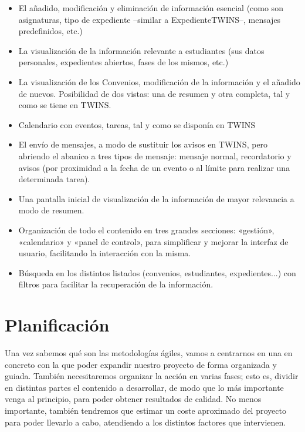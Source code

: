 \begin{itemize}
	\item El añadido, modificación y eliminación de información esencial (como son asignaturas, tipo de expediente --similar a \gls{ExpedienteTWINS}--, mensajes predefinidos, etc.)
	\item La visualización de la información relevante a estudiantes (sus datos personales, expedientes abiertos, fases de los mismos, etc.)
	\item La visualización de los \glspl{Convenio}, modificación de la información y el añadido de nuevos. Posibilidad de dos vistas: una de resumen y otra completa, tal y como se tiene en TWINS.
	\item Calendario con eventos, tareas, tal y como se disponía en TWINS
	\item El envío de mensajes, a modo de sustituir los avisos en TWINS, pero abriendo el abanico a tres tipos de mensaje: mensaje normal, recordatorio y avisos (por proximidad a la fecha de un evento o al límite para realizar una determinada tarea).
	\item Una pantalla inicial de visualización de la información de mayor relevancia a modo de resumen. 
	\item Organización de todo el contenido en tres grandes secciones: «gestión», «calendario» y «panel de control», para simplificar y mejorar la interfaz de usuario, facilitando la interacción con la misma.
	\item Búsqueda en los distintos listados (convenios, estudiantes, expedientes...) con filtros para facilitar la recuperación de la información.
\end{itemize}



\section{Planificación}
\label{sec:planificacion}

Una vez sabemos qué son las metodologías ágiles, vamos a centrarnos en una en concreto con la que poder expandir nuestro proyecto de forma organizada y guiada. También necesitaremos organizar la acción en varias fases; esto es, dividir en distintas partes el contenido a desarrollar, de modo que lo más importante venga al principio, para poder obtener resultados de calidad. No menos importante, también tendremos que estimar un coste aproximado del proyecto para poder llevarlo a cabo, atendiendo a los distintos factores que intervienen.

